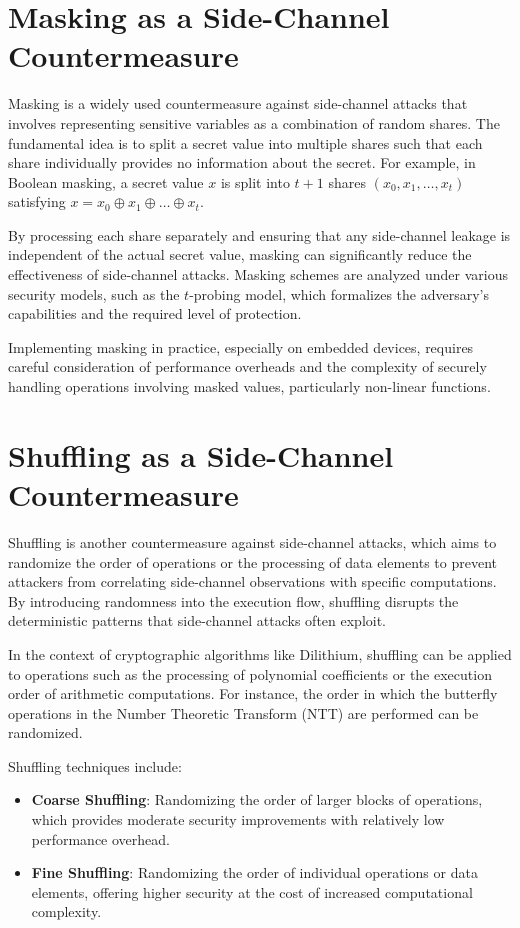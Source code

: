 \section{Masking as a Side-Channel Countermeasure}

Masking is a widely used countermeasure against side-channel attacks that involves representing sensitive variables as a combination of random shares. The fundamental idea is to split a secret value into multiple shares such that each share individually provides no information about the secret. For example, in Boolean masking, a secret value $x$ is split into $t+1$ shares $(x_0, x_1, \dots, x_t)$ satisfying $x = x_0 \oplus x_1 \oplus \dots \oplus x_t$.

By processing each share separately and ensuring that any side-channel leakage is independent of the actual secret value, masking can significantly reduce the effectiveness of side-channel attacks. Masking schemes are analyzed under various security models, such as the $t$-probing model, which formalizes the adversary's capabilities and the required level of protection.

Implementing masking in practice, especially on embedded devices, requires careful consideration of performance overheads and the complexity of securely handling operations involving masked values, particularly non-linear functions.

\section{Shuffling as a Side-Channel Countermeasure}

Shuffling is another countermeasure against side-channel attacks, which aims to randomize the order of operations or the processing of data elements to prevent attackers from correlating side-channel observations with specific computations. By introducing randomness into the execution flow, shuffling disrupts the deterministic patterns that side-channel attacks often exploit.

In the context of cryptographic algorithms like Dilithium, shuffling can be applied to operations such as the processing of polynomial coefficients or the execution order of arithmetic computations. For instance, the order in which the butterfly operations in the Number Theoretic Transform (NTT) are performed can be randomized.

Shuffling techniques include:

\begin{itemize}
    \item \textbf{Coarse Shuffling}: Randomizing the order of larger blocks of operations, which provides moderate security improvements with relatively low performance overhead.
    \item \textbf{Fine Shuffling}: Randomizing the order of individual operations or data elements, offering higher security at the cost of increased computational complexity.
\end{itemize}

